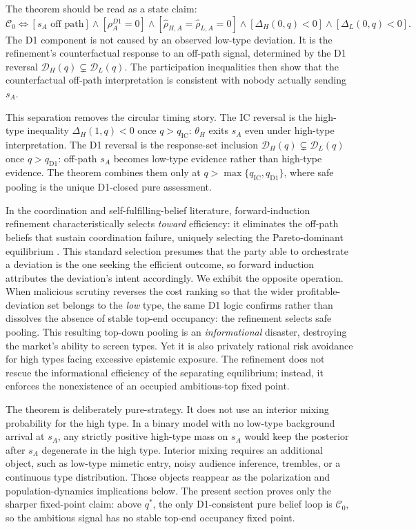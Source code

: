 The theorem should be read as a state claim:
\[
\mathcal C_0
\Longleftrightarrow
\left[
s_A\text{ off path}
\right]
\wedge
\left[
\rho_A^{D1}=0
\right]
\wedge
\left[
\widehat\rho_{H,A}=\widehat\rho_{L,A}=0
\right]
\wedge
\left[
\Delta_H(0,q)<0
\right]
\wedge
\left[
\Delta_L(0,q)<0
\right].
\]
The D1 component is not caused by an observed low-type deviation. It is the refinement's counterfactual response to an off-path signal, determined by the D1 reversal \(\mathcal D_H(q)\subsetneq\mathcal D_L(q)\). The participation inequalities then show that the counterfactual off-path interpretation is consistent with nobody actually sending \(s_A\).

This separation removes the circular timing story. The IC reversal is the high-type inequality \(\Delta_H(1,q)<0\) once \(q>q_{\mathrm{IC}}\): \(\theta_H\) exits \(s_A\) even under high-type interpretation. The D1 reversal is the response-set inclusion \(\mathcal D_H(q)\subsetneq\mathcal D_L(q)\) once \(q>q_{\mathrm{D1}}\): off-path \(s_A\) becomes low-type evidence rather than high-type evidence. The theorem combines them only at \(q>\max\{q_{\mathrm{IC}},q_{\mathrm{D1}}\}\), where safe pooling is the unique D1-closed pure assessment.

In the coordination and self-fulfilling-belief literature, forward-induction refinement characteristically selects \emph{toward} efficiency: it eliminates the off-path beliefs that sustain coordination failure, uniquely selecting the Pareto-dominant equilibrium \citep[e.g., the refinement resolutions of][]{diamond1983bank}. This standard selection presumes that the party able to orchestrate a deviation is the one seeking the efficient outcome, so forward induction attributes the deviation's intent accordingly. We exhibit the opposite operation. When malicious scrutiny reverses the cost ranking so that the wider profitable-deviation set belongs to the \emph{low} type, the same D1 logic confirms rather than dissolves the absence of stable top-end occupancy: the refinement selects safe pooling. This resulting top-down pooling is an \emph{informational} disaster, destroying the market's ability to screen types. Yet it is also privately rational risk avoidance for high types facing excessive epistemic exposure. The refinement does not rescue the informational efficiency of the separating equilibrium; instead, it enforces the nonexistence of an occupied ambitious-top fixed point.

The theorem is deliberately pure-strategy. It does not use an interior mixing probability for the high type. In a binary model with no low-type background arrival at \(s_A\), any strictly positive high-type mass on \(s_A\) would keep the posterior after \(s_A\) degenerate in the high type. Interior mixing requires an additional object, such as low-type mimetic entry, noisy audience inference, trembles, or a continuous type distribution. Those objects reappear as the polarization and population-dynamics implications below. The present section proves only the sharper fixed-point claim: above \(q^*\), the only D1-consistent pure belief loop is \(\mathcal C_0\), so the ambitious signal has no stable top-end occupancy fixed point.
